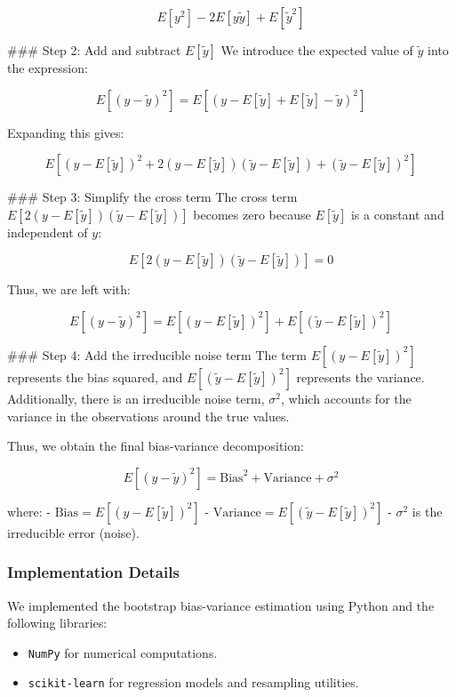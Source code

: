 \documentclass{article}
\begin{document}
\begin{enumerate}
\[
E[y^2] - 2E[y\tilde{y}] + E[\tilde{y}^2]
\]

### Step 2: Add and subtract $E[\tilde{y}]$
\newline\newline
We introduce the expected value of $\tilde{y}$ into the expression:

\[
E[(y - \tilde{y})^2] = E[(y - E[\tilde{y}] + E[\tilde{y}] - \tilde{y})^2]
\]

Expanding this gives:

\[
E[(y - E[\tilde{y}])^2 + 2(y - E[\tilde{y}])(\tilde{y} - E[\tilde{y}]) + (\tilde{y} - E[\tilde{y}])^2]
\]

### Step 3: Simplify the cross term
\newline\newline
The cross term $E[2(y - E[\tilde{y}])(\tilde{y} - E[\tilde{y}])]$ becomes zero because $E[\tilde{y}]$ is a constant and independent of $y$:

\[
E[2(y - E[\tilde{y}])(\tilde{y} - E[\tilde{y}])] = 0
\]

Thus, we are left with:

\[
E[(y - \tilde{y})^2] = E[(y - E[\tilde{y}])^2] + E[(\tilde{y} - E[\tilde{y}])^2]
\]

### Step 4: Add the irreducible noise term
\newline\newline
The term $E[(y - E[\tilde{y}])^2]$ represents the bias squared, and $E[(\tilde{y} - E[\tilde{y}])^2]$ represents the variance. Additionally, there is an irreducible noise term, $\sigma^2$, which accounts for the variance in the observations around the true values.

Thus, we obtain the final bias-variance decomposition:

\[
E[(y - \tilde{y})^2] = \text{Bias}^2 + \text{Variance} + \sigma^2
\]

where:
- $\text{Bias} = E[(y - E[\tilde{y}])^2]$
- $\text{Variance} = E[(\tilde{y} - E[\tilde{y}])^2]$
- $\sigma^2$ is the irreducible error (noise).





\subsubsection{Implementation Details}

We implemented the bootstrap bias-variance estimation using Python and the following libraries:

\begin{itemize} \item \texttt{NumPy} for numerical computations. \item \texttt{scikit-learn} for regression models and resampling utilities. \cite{scikit-learn} \end{itemize}


\end{enumerate}
\end{document}
